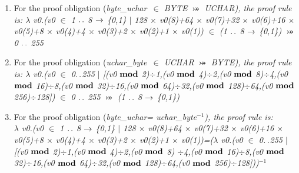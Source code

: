 \documentclass[a4paper]{llncs}
\begin{document}
\begin{enumerate}

\item For the proof obligation (\it byte\_uchar\rm \ $\in$ \textit{BYTE} $\bij$
\textit{UCHAR}), the proof rule is: $\lambda$ \it v0\rm .\rm (\it v0 $\in$  \rm 1 $\upto$ \rm 8  $\fun$  \rm \{\rm 0\rm ,\rm 1\rm \}  $\mid$  \rm 1\rm 2\rm 8 $\times$ \it v0\rm (\rm 8\rm )\rm +\rm 6\rm 4 $\times$ \it v0\rm (\rm 7\rm )\rm +\rm 3\rm 2 $\times$ \it v0\rm (\rm 6\rm )\rm +\rm 1\rm 6 $\times$ \it v0\rm (\rm 5\rm )\rm +\rm 8 $\times$ \it v0\rm (\rm 4\rm )\rm +\rm 4 $\times$ \it v0\rm (\rm 3\rm )\rm +\rm 2 $\times$ \it v0\rm (\rm 2\rm )\rm +\rm 1 $\times$ \it v0\rm (\rm 1\rm )\rm ) \rm $\in$ \rm (\rm 1 $\upto$ \rm 8  $\fun$  \rm \{\rm 0\rm ,\rm 1\rm \}\rm )  $\bij$  \rm 0 $\upto$ \rm 2\rm 5\rm 5 \\

\item For the proof obligation (\it uchar\_byte\rm \ $\in$ \textit{UCHAR} $\bij$
\textit{BYTE}), the proof rule is: $\lambda$ \it v0\rm .\rm (\it v0 $\in$  \rm 0$\upto$255  $\mid$  \rm \rm  [(\it v0  $\mod$  \rm 2)$\div$1,(\it v0  $\mod$  \rm 4)$\div$\rm 2\rm,(\it v0  $\mod$  \rm 8)$\div$\rm 4\rm,(\it v0  $\mod$  \rm 16)$\div$\rm 8\rm,(\it v0  $\mod$  \rm 32)$\div$\rm 1\rm 6\rm,(\it v0  $\mod$  \rm 6\rm 4)$\div$\rm 3\rm 2\rm,(\it v0  $\mod$  \rm 1\rm 2\rm 8)$\div$\rm 6\rm 4\rm,(\it v0  $\mod$  \rm 2\rm 5\rm 6)$\div$\rm 1\rm 2\rm 8\rm \rm ]\rm ) \rm   $\in$  \rm 0 $\upto$ \rm 2\rm 5\rm 5   $\bij$ \rm (\rm 1 $\upto$ \rm 8  $\fun$  \rm \{\rm 0\rm ,\rm 1\rm \}\rm )\\


\item For the proof obligation (\it byte\_uchar\rm  =  \it
uchar\_byte\rm$^{-1}$), the proof rule is:\\ $\lambda$ \it v0\rm .\rm (\it v0 $\in$  \rm 1 $\upto$ \rm 8  $\fun$  \rm \{\rm 0\rm ,\rm 1\rm \}  $\mid$  \rm 1\rm 2\rm 8 $\times$ \it v0\rm (\rm 8\rm )\rm +\rm 6\rm 4 $\times$ \it v0\rm (\rm 7\rm )\rm +\rm 3\rm 2 $\times$ \it v0\rm (\rm 6\rm )\rm +\rm 1\rm 6 $\times$ \it v0\rm (\rm 5\rm )\rm +\rm 8 $\times$ \it v0\rm (\rm 4\rm )\rm +\rm 4 $\times$ \it v0\rm (\rm 3\rm )\rm +\rm 2 $\times$ \it v0\rm (\rm 2\rm )\rm +\rm 1 $\times$ \it v0\rm (\rm 1\rm )\rm )=($\lambda$ \it v0\rm .\rm (\it v0 $\in$  \rm 0$\upto$255  $\mid$  \rm \rm  [(\it v0  $\mod$  \rm 2)$\div$1,(\it v0  $\mod$  \rm 4)$\div$\rm 2\rm,(\it v0  $\mod$ \rm 8) $\div$\rm 4\rm,(\it v0  $\mod$  \rm 16)$\div$\rm 8\rm,(\it v0  $\mod$  \rm 32)$\div$\rm 1\rm 6\rm,(\it v0  $\mod$ \rm 6\rm 4)$\div$\rm 3\rm 2\rm,(\it v0  $\mod$  \rm 1\rm 2\rm 8)$\div$\rm 6\rm 4\rm,(\it v0  $\mod$  \rm 2\rm 5\rm 6)$\div$\rm 1\rm 2\rm 8\rm \rm ]\rm )\rm)$^{-1}$
\end{enumerate}
\end{document}
